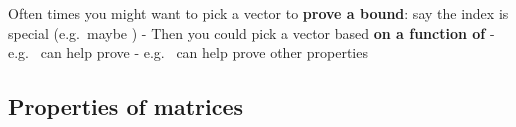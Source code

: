 Often times you might want to pick a vector to \textbf{prove a bound}:
say the index  is special (e.g.~maybe
)
- Then you could pick a vector  based \textbf{on a
  function of } -
e.g.~ can
help prove
-
e.g.~
can help prove other properties

\subsection*{Properties of matrices}

